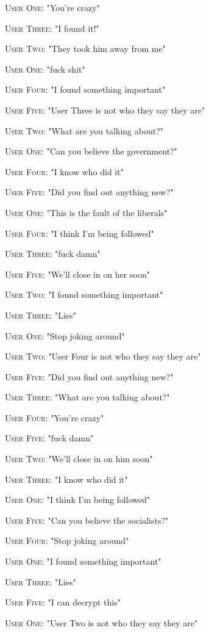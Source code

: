 \documentclass{report}
\begin{document}
\textsc{User One}: "You're crazy" 

\textsc{User Three}: "I found it!" 

\textsc{User Two}: "They took him away from me" 

\textsc{User One}: "fuck shit" 

\textsc{User Four}: "I found something important" 

\textsc{User Five}: "User Three is not who they say they are" 

\textsc{User Two}: "What are you talking about?" 

\textsc{User One}: "Can you believe the government?" 

\textsc{User Four}: "I know who did it" 

\textsc{User Five}: "Did you find out anything new?" 

\textsc{User One}: "This is the fault of the liberals" 

\textsc{User Four}: "I think I'm being followed" 

\textsc{User Three}: "fuck damn" 

\textsc{User Five}: "We'll close in on her soon" 

\textsc{User Two}: "I found something important" 

\textsc{User Three}: "Lies" 

\textsc{User One}: "Stop joking around" 

\textsc{User Two}: "User Four is not who they say they are" 

\textsc{User Five}: "Did you find out anything new?" 

\textsc{User Three}: "What are you talking about?" 

\textsc{User Four}: "You're crazy" 

\textsc{User Five}: "fuck damn" 

\textsc{User Two}: "We'll close in on him soon" 

\textsc{User Three}: "I know who did it" 

\textsc{User One}: "I think I'm being followed" 

\textsc{User Five}: "Can you believe the socialists?" 

\textsc{User Four}: "Stop joking around" 

\textsc{User One}: "I found something important" 

\textsc{User Three}: "Lies" 

\textsc{User Five}: "I can decrypt this" 

\textsc{User One}: "User Two is not who they say they are" 
\end{document}
